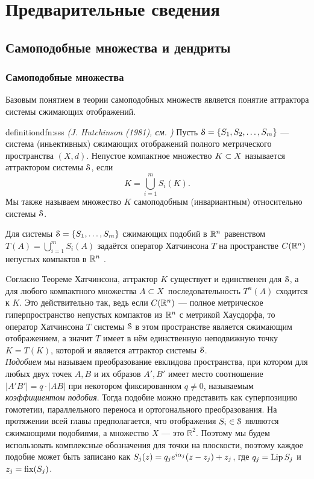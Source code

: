 \chapter{Предварительные сведения}

\section{Самоподобные множества и дендриты}

\subsection{Самоподобные множества}

Базовым понятием в теории самоподобных множеств является понятие аттрактора системы сжимающих отображений.

\begin{restatethis}{definition}{dfn:sss}%
{\em (J. Hutchinson (1981), см. {\cite{Hut1981}})} 
Пусть ${\EuScript S}=\{S_1, S_2, \ldots, S_m\}$ ---  система (иньективных) сжимающих отображений полного метрического пространства $(X, d)$.
Непустое компактное множество $K\subset X$ называется аттрактором системы ${\EuScript S}$, если 
$$K = \bigcup \limits_{i=1}^m S_i (K).$$
Мы также называем множество $K$ самоподобным (инвариантным) относительно системы ${\EuScript S}$.
\end{restatethis} 
\begin{definition}
Для системы ${\EuScript S}=\{S_1,\ldots,S_m\}$ сжимающих подобий в $\mathbb{R}^n$  равенством $T(A)=\bigcup\limits_{i=1}^m S_i(A)$ задаётся  оператор Хатчинсона $T$ на пространстве $C(\mathbb{R}^n)$ непустых компактов в $\mathbb{R}^n$ .
\end{definition}

Cогласно Теореме Хатчинсона, аттрактор $K$ существует и единственен для ${\EuScript S}$, а для любого компактного множества $A\subset X$ последовательность $T^n (A)$ сходится к $K$.
Это действительно так, ведь если $C(\mathbb{R}^n)$ --- полное метрическое гиперпространство непустых компактов из $\mathbb{R}^n$ с метрикой Хаусдорфа, то оператор Хатчинсона $T$ системы ${\EuScript S}$ в этом пространстве является сжимающим отображением, а значит $T$ имеет в нём единственную неподвижную точку $K=T(K)$, которой и является аттрактор системы ${\EuScript S}$.\\

{\em Подобием} мы называем преобразование евклидова пространства, при котором для любых двух точек $A, B$ и их образов $A',B'$ имеет место соотношение $|A'B'|=q\cdot |AB|$ при некотором фиксированном $q\neq 0$, называемым {\em коэффициентом подобия}.
Тогда подобие можно представить как суперпозицию гомотетии, параллельного переноса и ортогонального преобразования.
На протяжении всей главы предполагается, что отображения $S_i\in {\EuScript S}$ являются сжимающими подобиями, а множество $X$ --- это $\mathbb{R}^2$.
Поэтому мы будем использовать комплексные обозначения для точки на плоскости, поэтому каждое подобие может быть записано как $S_j(z)=q_j e^{i\alpha_j}(z-z_j)+z_j$, где $q_j=\mathop{\rm Lip} \nolimits S_j$ и $z_j=\mathop{\rm fix} \nolimits(S_j)$.

